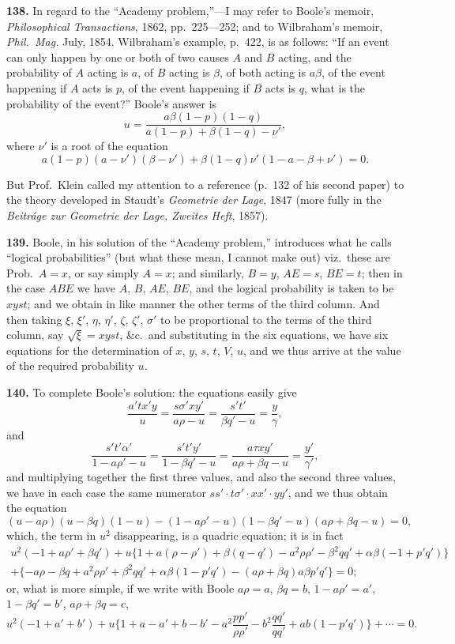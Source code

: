 \documentclass[11pt,a4paper]{article}
\begin{document}
\textbf{138.} In regard to the ``Academy problem,''---I may refer to Boole's memoir,
\textit{Philosophical Transactions}, 1862, pp.~225---252; and to Wilbraham's memoir, \textit{Phil.~Mag.}
July, 1854. Wilbraham's example, p.~422, is as follows: ``If an event can only happen
by one or both of two causes $A$ and $B$ acting, and the probability of $A$ acting is $a$, of
$B$ acting is $\beta$, of both acting is $a\beta$, of the event happening if $A$ acts is $p$, of the event
happening if $B$ acts is $q$, what is the probability of the event?'' Boole's answer is
\[
u = \frac{a\beta(1-p)(1-q)}{a(1-p)+\beta(1-q)-\nu'},
\]
where $\nu'$ is a root of the equation
\[
a(1-p)(a-\nu')(\beta-\nu')+\beta(1-q)\nu'(1-a-\beta+\nu')=0.
\]

But Prof.\ Klein called my attention to a reference (p.~132 of his second paper) to the theory
developed in Staudt's \textit{Geometrie der Lage}, 1847 (more fully in the \textit{Beitr\'{a}ge zur Geometrie der}
\textit{Lage, Zweites Heft}, 1857).

\textbf{139.} Boole, in his solution of the ``Academy problem,'' introduces what he calls
``logical probabilities'' (but what these mean, I cannot make out) viz.\ these are
Prob.\ $A=x$, or say simply $A=x$; and similarly, $B=y$, $AE=s$, $BE=t$; then in the case
$ABE$ we have $A$, $B$, $AE$, $BE$, and the logical probability is taken to be $xyst$; and we
obtain in like manner the other terms of the third column. And then taking $\xi$, $\xi'$,
$\eta$, $\eta'$, $\zeta$, $\zeta'$, $\sigma'$ to be proportional to the terms of the third column, say
$\sqrt{\xi}=xyst$, \&c.\ and substituting in the six equations, we have six equations for
the determination of $x$, $y$, $s$, $t$, $V$, $u$, and we thus arrive at the value of the required
probability $u$.

\textbf{140.} To complete Boole's solution: the equations easily give
\[
\frac{a'tx'y}{u} = \frac{s\sigma'xy'}{a\rho-u} = \frac{s't'}{\beta q'-u} = \frac{y}{\gamma},
\]
and
\[
\frac{s't'\alpha'}{1-a\rho'-u} = \frac{s't'y'}{1-\beta q'-u} = \frac{a\tau xy'}{a\rho+\beta q-u} = \frac{y'}{\gamma'},
\]
and multiplying together the first three values, and also the second three values, we
have in each case the same numerator $ss'\cdot t\sigma'\cdot xx'\cdot yy'$, and we thus obtain the equation
\[
(u-a\rho)(u-\beta q)(1-u)-(1-a\rho'-u)(1-\beta q'-u)(a\rho+\beta q-u)=0,
\]
which, the term in $u^2$ disappearing, is a quadric equation; it is in fact
\begin{multline*}
u^2(-1+a\rho'+\beta q') + u\{1+a(\rho-\rho')+\beta(q-q')-a^2\rho\rho'-\beta^2qq'+\alpha\beta(-1+p'q')\}\\
+ \{-a\rho-\beta q+a^2\rho\rho'+\beta^2qq'+\alpha\beta(1-p'q')-(a\rho+\beta q)a\beta p'q'\} = 0;
\end{multline*}
or, what is more simple, if we write with Boole $a\rho=a$, $\beta q=b$, $1-a\rho'=a'$, $1-\beta q'=b'$,
$a\rho+\beta q=c$,
\[
u^2(-1+a'+b') + u\{1+a-a'+b-b'-a^2\frac{pp'}{\rho\rho'}-b^2\frac{qq'}{qq'}+ab(1-p'q')\} + \cdots = 0.
\]
\end{document}
